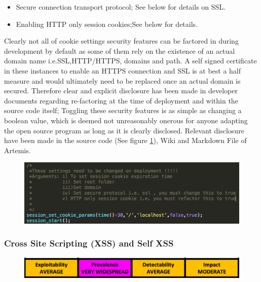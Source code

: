 \begin{enumerate}
\begin{enumerate}
\begin{itemize}
                    \item Secure connection transport protocol; See below for details on SSL.
                    \item Enabling HTTP only session cookies;See below for details.
                \end{itemize}
                Clearly not all of cookie settings security features can  be factored in during development by default as some of them rely on the existence of an actual domain name i.e.SSL,HTTP/HTTPS, domains and path. A self signed certificate in these instances to enable an HTTPS connection and SSL is at best a half measure and would ultimately need to be replaced once an actual domain is secured. Therefore clear and explicit disclosure has been made in developer documents regarding re-factoring at the time of deployment and within the source code itself; Toggling these security features is as simple as changing a boolean value, which is deemed not unreasonably onerous for anyone adapting the open source program as long as it is clearly disclosed. Relevant disclosure have been made in the source code (See figure \ref{ProductionCookieMessage}), Wiki and Markdown File of Artemis.
                \begin{figure}[h]
                	\includegraphics[scale=0.55,right]{chapters/chapter03/figures/secureSession.png}
                	\label{ProductionCookieMessage}
                \end{figure}
                            
        \end{enumerate}
    \end{enumerate}

    \subsubsection{Cross Site Scripting (XSS) and Self XSS}
    
    \begin{figure}[h]
    	\includegraphics[scale=0.55,center]{chapters/chapter03/figures/XSSClassification.png}
    	\label{XSSclassification}
    \end{figure}
    
